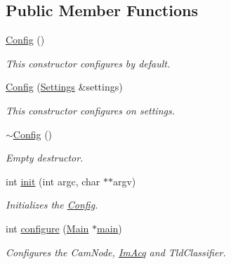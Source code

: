 \subsection*{Public Member Functions}
\begin{DoxyCompactItemize}
\item 
\hyperlink{classtld_1_1Config_a41ed67defe7392fe1ecc3233ad2a7a62}{Config} ()
\begin{DoxyCompactList}\small\item\em This constructor configures by default. \end{DoxyCompactList}\item 
\hyperlink{classtld_1_1Config_ade40e6027fbdc054bd5772a5baa898ae}{Config} (\hyperlink{classtld_1_1Settings}{Settings} \&settings)
\begin{DoxyCompactList}\small\item\em This constructor configures on settings. \end{DoxyCompactList}\item 
\hyperlink{classtld_1_1Config_a794ffe6627a441e41f22d368a279f2e5}{$\sim$\-Config} ()
\begin{DoxyCompactList}\small\item\em Empty destructor. \end{DoxyCompactList}\item 
int \hyperlink{classtld_1_1Config_ab2f2fb863b08832e2b877e6f09073333}{init} (int argc, char $\ast$$\ast$argv)
\begin{DoxyCompactList}\small\item\em Initializes the \hyperlink{classtld_1_1Config}{Config}. \end{DoxyCompactList}\item 
int \hyperlink{classtld_1_1Config_a920f1659e8823a127eca60b228da416a}{configure} (\hyperlink{classMain}{Main} $\ast$\hyperlink{QOpenTLD_8cpp_a3c04138a5bfe5d72780bb7e82a18e627}{main})
\begin{DoxyCompactList}\small\item\em Configures the Cam\-Node, \hyperlink{structImAcq}{Im\-Acq} and Tld\-Classifier. \end{DoxyCompactList}\end{DoxyCompactItemize}
